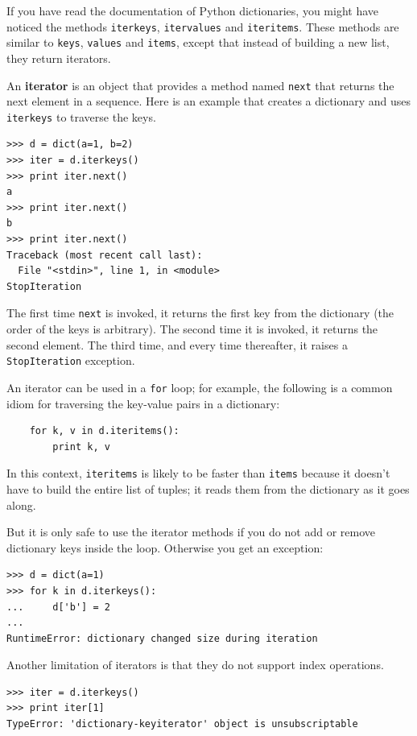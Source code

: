 \documentclass[10pt]{book}
\begin{document}
If you have read the documentation of Python dictionaries,
you might have noticed the methods {\tt iterkeys}, {\tt itervalues}
and {\tt iteritems}.  These methods are similar to {\tt keys},
{\tt values} and {\tt items}, except that instead of building
a new list, they return iterators.

An {\bf iterator} is an object that provides a method named
{\tt next} that returns the next element in a sequence.  Here
is an example that creates a dictionary and uses {\tt iterkeys}
to traverse the keys.

\begin{verbatim}
>>> d = dict(a=1, b=2)
>>> iter = d.iterkeys()
>>> print iter.next()
a
>>> print iter.next()
b
>>> print iter.next()
Traceback (most recent call last):
  File "<stdin>", line 1, in <module>
StopIteration
\end{verbatim}

The first time {\tt next} is invoked, it returns the first key from
the dictionary (the order of the keys is arbitrary).  The second
time it is invoked, it returns the second element.  The third time,
and every time thereafter, it raises a {\tt StopIteration}
exception.

An iterator can be used in a {\tt for} loop; for example, the
following is a common idiom for traversing the key-value
pairs in a dictionary:

\begin{verbatim}
    for k, v in d.iteritems():
        print k, v
\end{verbatim}

In this context, {\tt iteritems} is likely to be faster than
{\tt items} because it doesn't have to build the entire list
of tuples; it reads them from the dictionary as it goes along.

But it is only safe to use the iterator methods if you do not add or
remove dictionary keys inside the loop.  Otherwise you get an
exception:

\begin{verbatim}
>>> d = dict(a=1)
>>> for k in d.iterkeys():
...     d['b'] = 2
...
RuntimeError: dictionary changed size during iteration
\end{verbatim}

Another limitation of iterators is that they do not support index
operations.

\begin{verbatim}
>>> iter = d.iterkeys()
>>> print iter[1]
TypeError: 'dictionary-keyiterator' object is unsubscriptable
\end{verbatim}
\end{document}
